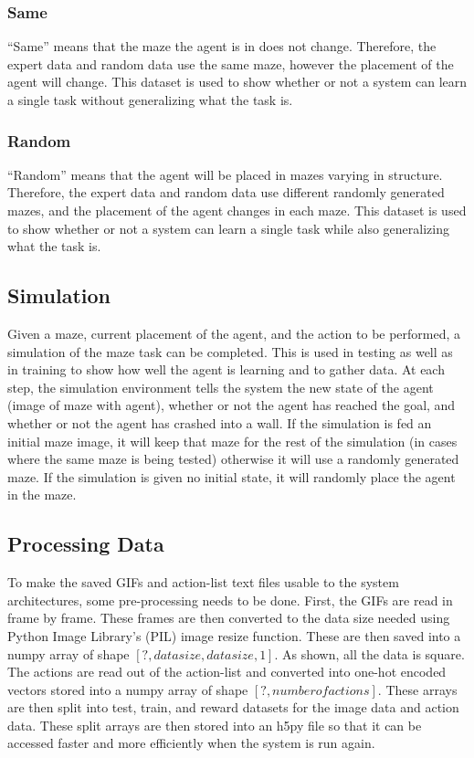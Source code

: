 \documentclass[12pt,american]{report}
\begin{document}
\subsubsection{Same}
``Same'' means that the maze the agent is in does not change.  Therefore, the expert data and random data use the same maze, however the placement of the agent will change.  This dataset is used to show whether or not a system can learn a single task without generalizing what the task is.

\subsubsection{Random}
``Random'' means that the agent will be placed in mazes varying in structure.  Therefore, the expert data and random data use different randomly generated mazes, and the placement of the agent changes in each maze.  This dataset is used to show whether or not a system can learn a single task while also generalizing what the task is.

\subsection{Simulation}
Given a maze, current placement of the agent, and the action to be performed, a simulation of the maze task can be completed.  This is used in testing as well as in training to show how well the agent is learning and to gather data.  At each step, the simulation environment tells the system the new state of the agent (image of maze with agent), whether or not the agent has reached the goal, and whether or not the agent has crashed into a wall.  If the simulation is fed an initial maze image, it will keep that maze for the rest of the simulation (in cases where the same maze is being tested) otherwise it will use a randomly generated maze.  If the simulation is given no initial state, it will randomly place the agent in the maze.

\subsection{Processing Data}
To make the saved GIFs and action-list text files usable to the system architectures, some pre-processing needs to be done.  First, the GIFs are read in frame by frame.  These frames are then converted to the data size needed using Python Image Library's (PIL) image resize function.  These are then saved into a numpy array of shape $[?,data size, data size, 1]$.  As shown, all the data is square.  The actions are read out of the action-list and converted into one-hot encoded vectors stored into a numpy array of shape $[?,number of actions]$.  These arrays are then split into test, train, and reward datasets for the image data and action data.  These split arrays are then stored into an h5py file so that it can be accessed faster and more efficiently when the system is run again. 
\end{document}
